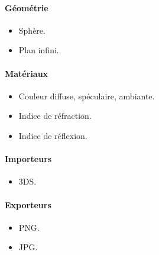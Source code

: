 \paragraph{Géométrie}
\begin{itemize}
  \item Sphère.
  \item Plan infini.
\end{itemize}

\paragraph{Matériaux}
\begin{itemize}
  \item Couleur diffuse, spéculaire, ambiante.
  \item Indice de réfraction.
  \item Indice de réflexion.
\end{itemize}

\paragraph{Importeurs}
\begin{itemize}
  \item 3DS.
\end{itemize}

\paragraph{Exporteurs}
\begin{itemize}
  \item PNG.
  \item JPG.
\end{itemize}

